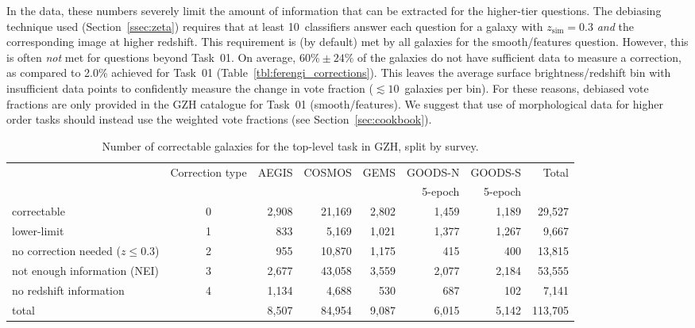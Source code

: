 \documentclass[a4paper,fleqn,usenatbib]{mnras}
\begin{document}
In the \ferengi{} data, these numbers severely limit the amount of information
that can be extracted for the higher-tier questions. The debiasing technique
used (Section~\ref{ssec:zeta}) requires that at least 10~classifiers answer each
question for a galaxy with $z_\mathrm{sim}=0.3$ \emph{and} the corresponding
image at higher redshift. This requirement is (by default) met by all galaxies
for the smooth/features question. However, this is often \emph{not} met for
questions beyond Task~01. On average, $60\%\pm24\%$ of the galaxies do not have
sufficient data to measure a correction, as compared to 2.0\% achieved for
Task~01 (Table~\ref{tbl:ferengi_corrections}). This leaves the average
surface brightness/redshift bin 
with insufficient data points to confidently measure the change in vote fraction ($\lesssim10$~galaxies per bin). 
For these reasons, debiased vote fractions are only provided in the GZH catalogue for Task~01
(smooth/features). We suggest that use of morphological data for higher order tasks should instead use
the weighted vote fractions (see Section~\ref{sec:cookbook}).

\begin{table}
\caption{Number of correctable galaxies for the top-level task in GZH, split by \hst{} survey.}\label{tbl:hubble_debiasable}
\begin{tabular}{lcrrrrr|r}
\hline\hline
                                   & Correction type & AEGIS   & COSMOS & GEMS  & GOODS-N & GOODS-S  &  Total  \\
                                   &                 &         &        &       & 5-epoch & 5-epoch  &         \\
\hline
correctable                        & 0               & 2,908   & 21,169 & 2,802 & 1,459   & 1,189    &  29,527 \\
lower-limit                        & 1               &   833   &  5,169 & 1,021 & 1,377   & 1,267    &   9,667 \\
no correction needed ($z \le 0.3$) & 2               &   955   & 10,870 & 1,175 &   415   &   400    &  13,815 \\ 
not enough information (NEI)       & 3               & 2,677   & 43,058 & 3,559 & 2,077   & 2,184    &  53,555 \\
no redshift information            & 4               & 1,134   &  4,688 &   530 &   687   &   102    &   7,141 \\
\hline
total                              &                 & 8,507   & 84,954 & 9,087 & 6,015   & 5,142    & 113,705 \\
\hline\hline
\end{tabular}
\end{table}
\end{document}
